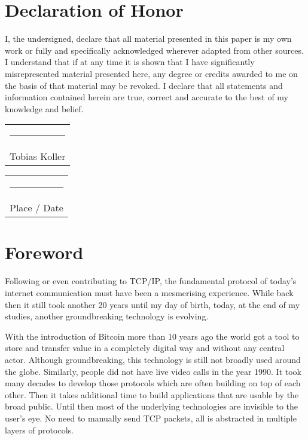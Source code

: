 \documentclass[final]{fhnwreport}       %
\begin{document}
\tableofcontents
\clearpage

\vfill\noindent
\section*{Declaration of Honor}

I, the undersigned, declare that all material presented in this paper is my own work or fully and specifically acknowledged wherever adapted from other sources. I understand that if at any time it is shown that I have significantly misrepresented material presented here, any degree or credits awarded to me on the basis of that material may be revoked. I declare that all statements and information contained herein are true, correct and accurate to the best of my knowledge and belief.   

\vspace*{4em}\noindent
\hfill%
\begin{tabular}[t]{c}
  \rule{10em}{0.4pt}\\Tobias Koller 
\end{tabular}%
\hfill%
\begin{tabular}[t]{c}
  \rule{10em}{0.4pt}\\ Place / Date
\end{tabular}%
\hfill\strut
\clearpage

\section*{Foreword}

Following or even contributing to TCP/IP, the fundamental protocol of today's internet communication must have been a mesmerising experience. While back then it still took another 20 years until my day of birth, today, at the end of my studies, another groundbreaking technology is evolving. 

With the introduction of Bitcoin more than 10 years ago the world got a tool to store and transfer value in a completely digital way and without any central actor. Although groundbreaking, this technology is still not broadly used around the globe. Similarly, people did not have live video calls in the year 1990. It took many decades to develop those protocols which are often building on top of each other. Then it takes additional time to build applications that are usable by the broad public.  Until then most of the underlying technologies are invisible to the user's eye. No need to manually send TCP packets, all is abstracted in multiple layers of protocols.
\end{document}
